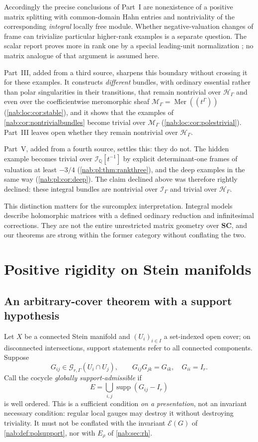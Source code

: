 \documentclass[11pt,letterpaper]{article}
\theoremstyle{definition}
\theoremstyle{remark}
\newcommand{\Q}{\mathbb Q}
\newcommand{\SC}{\mathbf{SC}}
\newcommand{\HH}{\mathscr H_\Gamma}
\newcommand{\II}{\mathscr I_\Gamma}
\newcommand{\GG}{\mathscr G_{r,\Gamma}}
\newcommand{\supp}{\operatorname{supp}}
\newcommand{\EU}{\mathcal E}
\newcommand{\MM}{\mathscr M_\Gamma}
\newcommand{\Mer}{\operatorname{Mer}}
\numberwithin{equation}{section}
\begin{document}
Accordingly the precise conclusions of Part~I are nonexistence of a positive
matrix splitting with common-domain Hahn entries and nontriviality of the
corresponding \emph{integral} locally free module. Whether negative-valuation changes of
frame can trivialize particular higher-rank examples is a separate question.
The scalar report proves more in rank one by a special leading-unit
normalization \cite{RepoGlobal}; no matrix analogue of that argument is
assumed here.

Part~III, added from a third source, sharpens this boundary without crossing
it for these examples. It constructs \emph{different} bundles, with ordinary
essential rather than polar singularities in their transitions, that remain
nontrivial over $\HH$ and even over the coefficientwise meromorphic sheaf
$\MM=\Mer((t^\Gamma))$ (\cref{nab:loc:cor:stable}), and it shows that the
examples of \cref{nab:cor:nontrivialbundles} become trivial over $\MM$
(\cref{nab:loc:cor:polestrivial}). Part~III leaves open whether they remain
nontrivial over $\HH$.

Part~V, added from a fourth source, settles this: they do not. The hidden
example becomes trivial over $\mathscr I_{\Q}[t^{-1}]$ by explicit
determinant-one frames of valuation at least $-3/4$
(\cref{nab:pl:thm:rankthree}), and the deep examples in the same way
(\cref{nab:pl:cor:deep}). The claim declined above was therefore rightly
declined: these integral bundles are nontrivial over $\II$ and trivial over
$\HH$.

This distinction matters for the surcomplex interpretation. Integral models
describe holomorphic matrices with a defined ordinary reduction and
infinitesimal corrections. They are not the entire unrestricted matrix
geometry over $\SC$, and our theorems are strong within the former category
without conflating the two.

\section{Positive rigidity on Stein manifolds}\label{nab:sec:stein}

\subsection{An arbitrary-cover theorem with a support hypothesis}

Let $X$ be a connected Stein manifold and $(U_i)_{i\in I}$ a set-indexed open
cover; on disconnected intersections, support statements refer to all connected
components. Suppose
\[
 G_{ij}\in\GG(U_i\cap U_j),\qquad G_{ij}G_{jk}=G_{ik},\quad G_{ii}=I_r.
\]
Call the cocycle \emph{globally support-admissible} if
\begin{equation}\label{nab:eq:Ecover}
 E=\bigcup_{i,j}\supp(G_{ij}-I_r)
\end{equation}
is well ordered. This is a sufficient condition \emph{on a presentation}, not
an invariant necessary condition: regular local gauges may destroy it without
destroying triviality. It must not be conflated with the invariant $\EU(G)$ of
\cref{nab:def:polsupport}, nor with $E_\rho$ of \cref{nab:sec:rh}.
\end{document}
